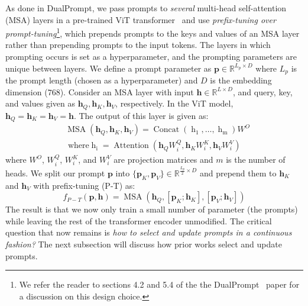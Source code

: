 As done in DualPrompt, we pass prompts to \emph{several} multi-head self-attention (MSA) layers in a pre-trained ViT transformer~\cite{dosovitskiy2020image,vaswani2017attention} and use \emph{prefix-tuning over prompt-tuning}\footnote{We refer the reader to sections 4.2 and 5.4 of the the DualPrompt~\cite{wang2022dualprompt} paper for a discussion on this design choice.}, which prepends prompts to the keys and values of an MSA layer rather than prepending prompts to the input tokens. The layers in which prompting occurs is set as a hyperparameter, and the prompting parameters are unique between layers. We define a prompt parameter as $\bm{p} \in \mathbb{R}^{L_{p} \times D}$ where $L_{p}$ is the prompt length (chosen as a hyperparameter) and $D$ is the embedding dimension ($768$). Consider an MSA layer with input $\bm{h} \in \mathbb{R}^{L \times D}$, and query, key, and values given as $\bm{h}_Q,  \bm{h}_K, \bm{h}_V$, respectively. In the ViT model, $\bm{h}_Q = \bm{h}_K = \bm{h}_V = \bm{h}$. The output of this layer is given as:
\begin{equation}
\begin{aligned}
&\operatorname{ MSA }(\bm{h}_Q, \bm{h}_K, \bm{h}_V) =\operatorname { Concat }\left(\operatorname { h }_{1}, \ldots, \operatorname { h }_{\mathrm{m}}\right) W^{O} \\
&\text { where} \operatorname{h}_{\mathrm{i}} =\operatorname{Attention}\left(\bm{h}_Q W_{i}^{Q}, \bm{h}_K W_{i}^{K}, \bm{h}_V W_{i}^{V}\right)
\label{eq:msa}
\end{aligned}
\end{equation}
where $W^{O}$, $W_{i}^{Q}$, $W_{i}^{K}$, and $W_{i}^{V}$ are projection matrices and $m$ is the number of heads. 
We split our prompt $\bm{p}$ into $\{\bm{p}_K,\bm{p}_V\} \in \mathbb{R}^{\frac{L_{p}}{2} \times D}$ and prepend them to $\bm{h}_K$ and $\bm{h}_V$ with prefix-tuning (P-T) as:
\begin{equation}
f_{P-T}(\bm{p},\bm{h}) = \operatorname{ MSA }(\bm{h}_Q, \left[ \bm{p}_K ;\bm{h}_K \right],\left[\bm{p}_V ;  \bm{h}_V \right]) 
\label{eq:msa_prefix}
\end{equation}
The result is that we now only train a small number of parameter (the prompts) while leaving the rest of the transformer encoder unmodified. The critical question that now remains is \emph{how to select and update prompts in a continuous fashion?} The next subsection will discuss how prior works select and update prompts.


